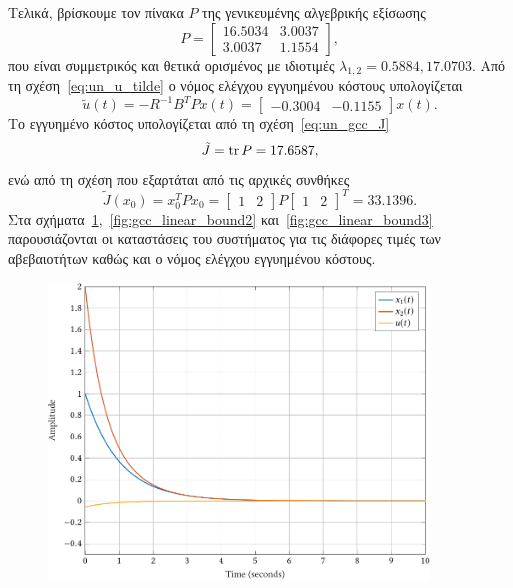 Τελικά, βρίσκουμε τον πίνακα \( P \) της γενικευμένης αλγεβρικής εξίσωσης
\[
    P =
    \begin{bmatrix}
        16.5034 & 3.0037 \\
        3.0037 & 1.1554
    \end{bmatrix},
\]
που είναι συμμετρικός και θετικά ορισμένος με ιδιοτιμές
\( \lambda_{1, 2} = 0.5884, 17.0703 \). Από τη σχέση~\eqref{eq:un_u_tilde}
ο νόμος ελέγχου εγγυημένου κόστους υπολογίζεται
\[
    \tilde{u}(t) = - R^{-1}B^{T}Px(t) =
    \begin{bmatrix}
        -0.3004 & -0.1155
    \end{bmatrix}x(t).
\]
Το εγγυημένο κόστος υπολογίζεται από τη σχέση~\eqref{eq:un_gcc_J}
\[
    \tilde{J} = \operatorname{tr}{P} = 17.6587,
\]
ενώ από τη σχέση που εξαρτάται από τις αρχικές συνθήκες
\[
    \tilde{J}(x_0) = x_0^{T}Px_0 =
    \begin{bmatrix}
        1 & 2
    \end{bmatrix}P
    \begin{bmatrix}
        1 & 2
    \end{bmatrix}^T = 33.1396.
\]
Στα σχήματα~\ref{fig:gcc_linear_bound1},~\ref{fig:gcc_linear_bound2}
και~\ref{fig:gcc_linear_bound3} παρουσιάζονται οι καταστάσεις του συστήματος για
τις διάφορες τιμές των αβεβαιοτήτων καθώς και ο νόμος ελέγχου εγγυημένου
κόστους.
\begin{figure}[h]
    \centering
    \includegraphics[width=0.9\textwidth]{figures/gcc_linear_bound1.pdf}
    \label{fig:gcc_linear_bound1}
\end{figure}
